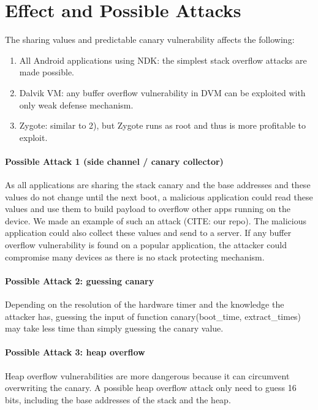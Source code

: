 \section{Effect and Possible Attacks}

The sharing values and predictable canary vulnerability affects the following:
\begin{enumerate}

\item All Android applications using NDK: the simplest stack overflow attacks are made possible.

\item Dalvik VM: any buffer overflow vulnerability in DVM can be exploited with only weak defense mechanism.

\item Zygote: similar to 2), but Zygote runs as root and thus is more profitable to exploit.

\end{enumerate}

\paragraph*{Possible Attack 1 (side channel / canary collector)} 

As all applications are sharing the stack canary and the base addresses and these values do not change until the next boot, a malicious application could read these values and use them to build payload to overflow other apps running on the device. We made an example of such an attack (CITE: our repo). The malicious application could also collect these values and send to a server. If any buffer overflow vulnerability is found on a popular application, the attacker could compromise many devices as there is no stack protecting mechanism.

\paragraph*{Possible Attack 2: guessing canary} 

Depending on the resolution of the hardware timer and the knowledge the attacker has,  guessing the input of function canary(boot\_time, extract\_times) may take less time than simply guessing the canary value.

\paragraph*{Possible Attack 3: heap overflow}

Heap overflow vulnerabilities are more dangerous because it can circumvent overwriting the canary. A possible heap overflow attack only need to guess 16 bits, including the base addresses of the stack and the heap.

